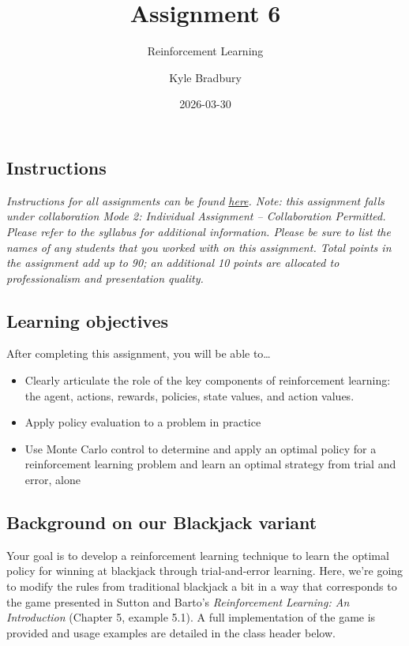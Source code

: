 \documentclass[
  letterpaper,
  DIV=11,
  numbers=noendperiod]{scrartcl}
\title{Assignment 6}
\subtitle{Reinforcement Learning}
\author{Kyle Bradbury}
\date{2026-03-30}
\providecommand{\tightlist}{%
  \setlength{\itemsep}{0pt}\setlength{\parskip}{0pt}}\usepackage{longtable,booktabs,array}
\renewcommand*\contentsname{Table of contents}
\newcommand\contentsname{Table of contents}
\begin{document}
\maketitle

\renewcommand*\contentsname{Table of contents}
{
\hypersetup{linkcolor=}
\setcounter{tocdepth}{1}
\tableofcontents
}

\subsection{Instructions}\label{instructions}

\emph{Instructions for all assignments can be found
\href{https://kylebradbury.github.io/ids705/notebooks/assignment_instructions.html}{here}.
Note: this assignment falls under collaboration Mode 2: Individual
Assignment -- Collaboration Permitted. Please refer to the syllabus for
additional information. Please be sure to list the names of any students
that you worked with on this assignment. Total points in the assignment
add up to 90; an additional 10 points are allocated to professionalism
and presentation quality.}

\subsection{Learning objectives}\label{learning-objectives}

After completing this assignment, you will be able to\ldots{}

\begin{itemize}
\tightlist
\item
  Clearly articulate the role of the key components of reinforcement
  learning: the agent, actions, rewards, policies, state values, and
  action values.
\item
  Apply policy evaluation to a problem in practice
\item
  Use Monte Carlo control to determine and apply an optimal policy for a
  reinforcement learning problem and learn an optimal strategy from
  trial and error, alone
\end{itemize}

\subsection{Background on our Blackjack
variant}\label{background-on-our-blackjack-variant}

Your goal is to develop a reinforcement learning technique to learn the
optimal policy for winning at blackjack through trial-and-error
learning. Here, we're going to modify the rules from traditional
blackjack a bit in a way that corresponds to the game presented in
Sutton and Barto's \emph{Reinforcement Learning: An Introduction}
(Chapter 5, example 5.1). A full implementation of the game is provided
and usage examples are detailed in the class header below.
\end{document}
